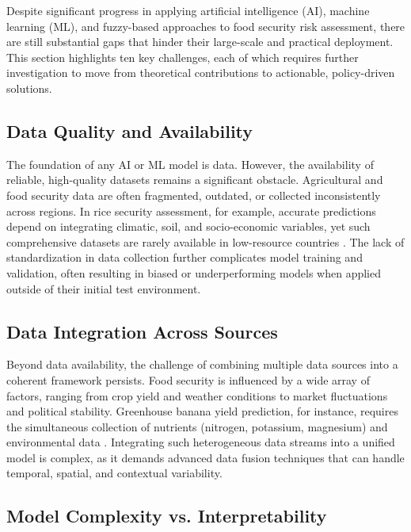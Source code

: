 \documentclass[preprint,12pt]{elsarticle}
\begin{document}
	Despite significant progress in applying artificial intelligence (AI),
	machine learning (ML), and fuzzy-based approaches to food security risk
	assessment, there are still substantial gaps that hinder their
	large-scale and practical deployment. This section highlights ten key
	challenges, each of which requires further investigation to move from
	theoretical contributions to actionable, policy-driven solutions.
	
	\subsection{Data Quality and Availability}
	
	The foundation of any AI or ML model is data. However, the availability
	of reliable, high-quality datasets remains a significant obstacle.
	Agricultural and food security data are often fragmented, outdated, or
	collected inconsistently across regions. In rice security assessment,
	for example, accurate predictions depend on integrating climatic, soil,
	and socio-economic variables, yet such comprehensive datasets are rarely
	available in low-resource countries \cite{ref61}. The lack of standardization
	in data collection further complicates model training and validation,
	often resulting in biased or underperforming models when applied outside
	of their initial test environment.
	
	\subsection{Data Integration Across Sources}
	
	Beyond data availability, the challenge of combining multiple data
	sources into a coherent framework persists. Food security is influenced
	by a wide array of factors, ranging from crop yield and weather
	conditions to market fluctuations and political stability. Greenhouse
	banana yield prediction, for instance, requires the simultaneous
	collection of nutrients (nitrogen, potassium, magnesium) and
	environmental data \cite{ref62}. Integrating such heterogeneous data streams
	into a unified model is complex, as it demands advanced data fusion
	techniques that can handle temporal, spatial, and contextual
	variability.
	
	\subsection{Model Complexity vs. Interpretability}
	
\end{document}
